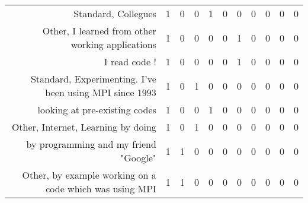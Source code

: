 {\begin{landscape}
\begin{longtable}[htb]{r|c|c|c|c|c|c|c|c|c|c}
{Standard, Collegues} & 1 & 0 & 0 & 1 & 0 & 0 & 0 & 0 & 0 & 0 \\%
{Other, I learned from other working applications} & 1 & 0 & 0 & 0 & 0 & 1 & 0 & 0 & 0 & 0 \\%
{I read code !} & 1 & 0 & 0 & 0 & 0 & 1 & 0 & 0 & 0 & 0 \\%
{Standard, Experimenting. I've been using MPI since 1993} & 1 & 0 & 1 & 0 & 0 & 0 & 0 & 0 & 0 & 0 \\%
{looking at pre-existing codes} & 1 & 0 & 0 & 1 & 0 & 0 & 0 & 0 & 0 & 0 \\%
{Other, Internet, Learning by doing} & 1 & 0 & 1 & 0 & 0 & 0 & 0 & 0 & 0 & 0 \\%
{by programming and my friend "Google"} & 1 & 1 & 0 & 0 & 0 & 0 & 0 & 0 & 0 & 0 \\%
{Other, by example working on a code which was using MPI} & 1 & 1 & 0 & 0 & 0 & 0 & 0 & 0 & 0 & 0 \\%
\hline%
\end{longtable}%
\end{landscape}}%
\clearpage%
